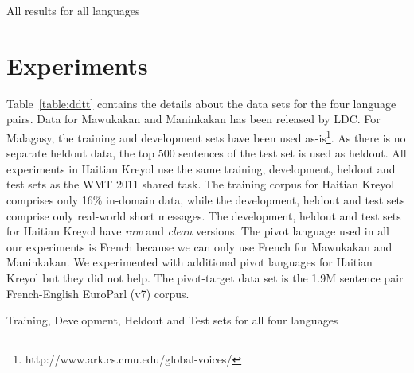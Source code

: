 \documentclass[11pt]{article}
\begin{document}
	

		\begin{table}[t]
			\small
			\centering
			
			\caption{All results for all languages}
			\label{table:all_results}
		\end{table}

\section{Experiments}
\label{sec:experiments}

 Table~\ref{table:ddtt} contains the details about the data sets for the four language pairs. Data for Mawukakan and Maninkakan has been released by LDC. For Malagasy, the training and development sets have been used as-is\footnote{http://www.ark.cs.cmu.edu/global-voices/}. As there is no separate heldout data, the top 500 sentences of the test set is used as heldout. All experiments in Haitian Kreyol use the same training, development, heldout and test sets as the WMT 2011 shared task. The training corpus for Haitian Kreyol comprises only 16\% in-domain data, while the development, heldout and test sets comprise only real-world short messages. The development, heldout and test sets for Haitian Kreyol have \emph{raw} and \emph{clean} versions. The pivot language used in all our experiments is French because we can only use French for Mawukakan and Maninkakan. We experimented with additional pivot languages for Haitian Kreyol but they did not help. The pivot-target data set is the 1.9M sentence pair French-English EuroParl (v7) corpus.
	\begin{table}
		\small
		\centering
		
		\caption{Training, Development, Heldout and Test sets for all four languages}
		\label{table:ddtt}
	\end{table}
\end{document}
